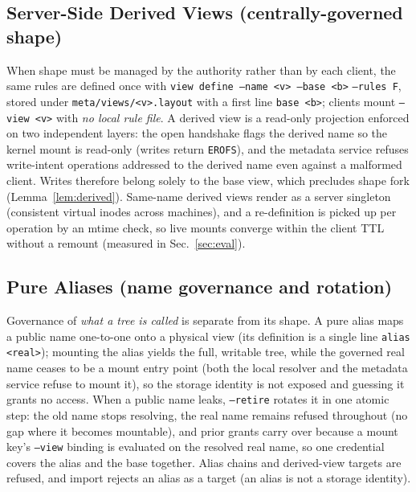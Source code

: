 \documentclass[numberedsection,acmtos]{acmart}
\begin{document}
\subsection{Server-Side Derived Views (centrally-governed shape)}
When shape must be managed by the authority rather than by each client, the
same rules are defined once with \texttt{view define --name \textless v\textgreater{} --base \textless b\textgreater{}}
\texttt{--rules F}, stored under \texttt{meta/views/\textless v\textgreater{}.layout} with a first line
\texttt{base \textless b\textgreater{}}; clients mount \texttt{--view \textless v\textgreater{}} with \emph{no local rule
file}. A derived view is a read-only projection enforced on two independent
layers: the open handshake flags the derived name so the kernel mount is
read-only (writes return \texttt{EROFS}), and the metadata service refuses
write-intent operations addressed to the derived name even against a
malformed client. Writes therefore belong solely to the base view, which
precludes shape fork (Lemma~\ref{lem:derived}). Same-name derived views render
as a server singleton (consistent virtual inodes across machines), and a
re-definition is picked up per operation by an mtime check, so live mounts
converge within the client TTL without a remount (measured in
Sec.~\ref{sec:eval}).

\subsection{Pure Aliases (name governance and rotation)}
Governance of \emph{what a tree is called} is separate from its shape. A pure
alias maps a public name one-to-one onto a physical view (its definition is a
single line \texttt{alias \textless real\textgreater{}}); mounting the alias yields the full,
writable tree, while the governed real name ceases to be a mount entry point
(both the local resolver and the metadata service refuse to mount it),
so the storage identity is not exposed and guessing it grants no access.
When a public name leaks, \texttt{--retire} rotates it in one atomic step: the
old name stops resolving, the real name remains refused throughout (no gap
where it becomes mountable), and prior grants carry over because a mount key's
\texttt{--view} binding is evaluated on the resolved real name, so one credential
covers the alias and the base together. Alias chains and derived-view targets are refused, and import
rejects an alias as a target (an alias is not a storage identity).
\end{document}
